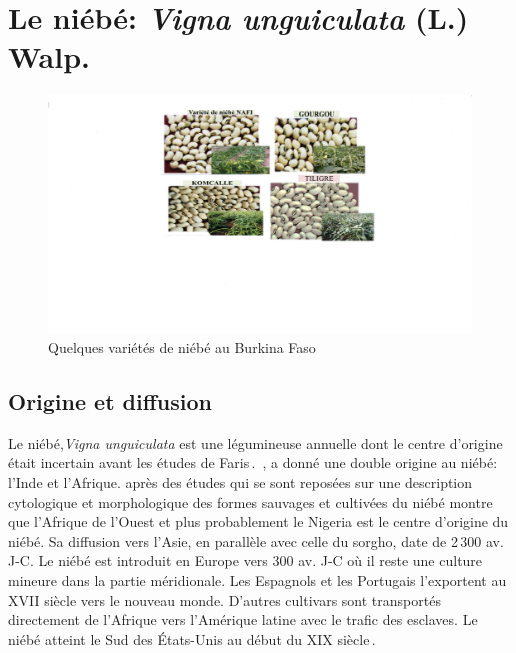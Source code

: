\documentclass[a4paper,11pt]{article}
\begin{document}
\section{Le niébé: \emph{Vigna unguiculata} (L.) Walp.}
\begin{figure}%
  \begin{center}
   \includegraphics[width=12cm]{images/graines_niebe}
  \end{center}
\caption{Quelques variétés de niébé au Burkina Faso}
\end{figure}

\newpage



\subsection{Origine et diffusion}

Le niébé,\emph{Vigna unguiculata} est une légumineuse annuelle dont le
centre d’origine était incertain avant les études de
Faris\,\cite{FARIS_1963,FARIS_1965}. \citeauthor{Piper_1913}\,\citeyear{Piper_1913},
a donné une double origine au niébé: l’Inde et
l’Afrique.\cite{FARIS_1963,FARIS_1965} après des études qui se sont
reposées sur une description cytologique et morphologique des formes
sauvages et cultivées du niébé montre que l’Afrique de l’Ouest et plus
probablement le Nigeria est le centre d’origine du niébé. Sa diffusion
vers l’Asie, en parallèle avec celle du sorgho, date de 2\,300
av. J-C. Le niébé est introduit en Europe vers 300 av. J-C où il reste
une culture mineure dans la partie méridionale. Les Espagnols et les
Portugais l’exportent au XVII\ieme{} siècle vers le nouveau
monde. D’autres cultivars sont transportés directement de l’Afrique
vers l’Amérique latine avec le trafic des esclaves. Le niébé atteint
le Sud des États-Unis au début du XIX\ieme{}
siècle\,\cite{Sawadogo_2009}.
\end{document}
